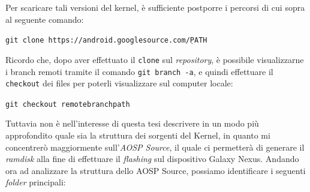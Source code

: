 Per scaricare tali versioni del kernel, è sufficiente postporre i percorsi di cui
sopra al seguente comando:
\begin{center}
\texttt{\small git clone https://android.googlesource.com/\d PATH}
\end{center}
Ricordo che, dopo aver effettuato il \texttt{\small clone} sul \textit{repository}, è possibile
visualizzarne i branch remoti tramite il comando \texttt{git branch -a}, e quindi 
effettuare il \texttt{\small checkout} dei files per poterli visualizzare sul 
computer locale:
\begin{center}
\texttt{\small git checkout remotebranchpath}
\end{center}
\medskip

Tuttavia non è nell'interesse di questa tesi descrivere in un modo più approfondito quale
sia la struttura dei sorgenti del Kernel, in quanto mi concentrerò maggiormente
sull'\textit{AOSP Source}, il quale ci permetterà di generare il \textit{ramdisk} alla
fine di effettuare il \textit{flashing} sul dispositivo Galaxy Nexus. 
Andando ora ad analizzare la struttura dello AOSP Source, possiamo identificare
i seguenti \textit{folder} principali:

